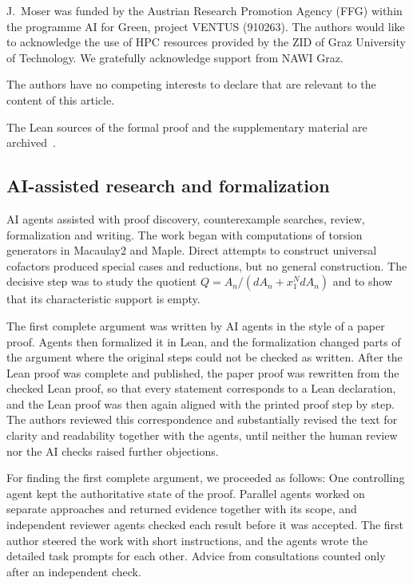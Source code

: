 \documentclass[pdflatex,sn-mathphys-num]{sn-jnl}
\numberwithin{equation}{section}
\theoremstyle{thmstyleone}
\theoremstyle{thmstyletwo}
\begin{document}
J.~Moser was funded by the Austrian Research Promotion Agency (FFG) within
the programme AI for Green, project VENTUS (910263). The
authors would like to acknowledge the use of HPC resources provided by the ZID
of Graz University of Technology. We gratefully acknowledge support from NAWI
Graz.

The authors have no competing interests to declare that are relevant to the
content of this article.

The Lean sources of the formal proof and the supplementary material are
archived~\cite{Stafford38Zenodo140,Stafford38Supplementary032}.

\begin{appendices}

\section{AI-assisted research and formalization}\label{app:ai-workflow}

AI agents assisted with proof discovery, counterexample searches,
review, formalization and writing. The work began with computations of torsion generators in
Macaulay2 and Maple. Direct attempts to construct universal cofactors
produced special cases and reductions, but no general construction. The
decisive step was to study the quotient $Q=A_n/(dA_n+x_1^N dA_n)$ and to show
that its characteristic support is empty.

The first complete argument was written by AI agents in the style of a paper
proof. Agents then formalized it in Lean, and the formalization changed parts
of the argument where the original steps could not be checked as written.
After the Lean proof was complete and published, the paper proof was rewritten
from the checked Lean proof, so that every statement corresponds to a Lean
declaration, and the Lean proof was then again aligned with the printed proof
step by step. The authors reviewed this correspondence and substantially revised the text for
clarity and readability together with the agents, until neither the human review nor the AI
checks raised further objections.

For finding the first complete argument, we proceeded as follows:
One controlling agent kept the authoritative state of the proof.
Parallel agents worked on separate approaches and returned evidence together
with its scope, and independent reviewer agents checked each result before it was
accepted. The first author steered the work with short instructions, and the
agents wrote the detailed task prompts for each other. Advice from
consultations counted only after an independent check.


\end{appendices}
\end{document}
